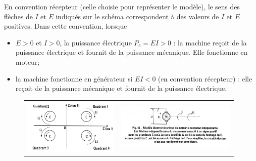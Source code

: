 \documentclass[11pt,a4paper]{report}
\begin{document}
En convention récepteur (celle choisie pour représenter le modèle), le sens des flèches de $I$ et $E$ indiqués sur le schéma correspondent à des valeurs de $I$ et $E$ positives. Dans cette convention, lorsque
\begin{itemize}
	\item $E > 0$ et $I >0$, la puissance électrique $P_e = EI > 0$ : la machine reçoit de la puissance 	électrique et fournit de la puissance mécanique. Elle fonctionne en moteur;
	\item la machine fonctionne en générateur si $EI < 0$ (en convention récepteur) : elle reçoit de la 	puissance mécanique et fournit de la puissance électrique.\\
\end{itemize}

\begin{figure}[h!]
	\begin{center}
		\begin{tabular}{cc}
			\includegraphics[scale=0.5]{quadrants.png} &
			\includegraphics[scale=0.5]{conventions.png} \\
		\end{tabular}
	\end{center}
\end{figure}
\end{document}
